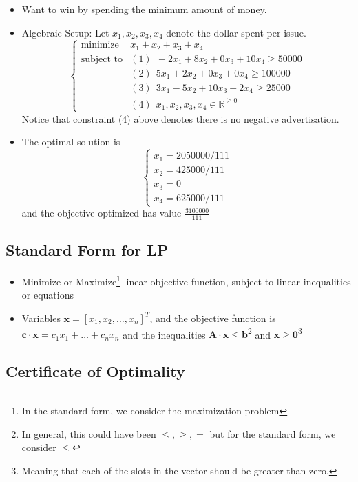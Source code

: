 \documentclass[10pt]{article}
\newcommand{\real}{\mathbb{R}}
\newcommand{\bx}{\mathbf{x}}
\begin{document}
\begin{itemize}
    \item Want to win by spending the minimum amount of money.
    \item Algebraic Setup: Let $x_1,x_2,x_3,x_4$ denote the dollar spent per issue. 
        $$
        \begin{cases}
            \text{minimize} &x_1 + x_2 + x_3 + x_4 \\
            \text{subject to} &(1)~~ -2x_1 + 8x_2 + 0x_3 + 10x_4 \geq 50000 \\
            &(2)~~5x_1 +2x_2 +0x_3 +0x_4 \geq 100000 \\
            &(3)~~ 3x_1 - 5x_2 + 10x_3 - 2x_4 \geq 25000 \\
            &(4)~~ x_1,x_2,x_3,x_4 \in \real^{\geq 0}
        \end{cases}
        $$
    Notice that constraint (4) above denotes there is no negative advertisation. 
    \item The optimal solution is 
        $$
        \begin{cases}
            x_1 = 2050000/111 \\
            x_2 = 425000/111 \\
            x_3 = 0 \\
            x_4 = 625000/111
        \end{cases}
        $$
        and the objective optimized has value $\frac{3100000}{111}$
\end{itemize}

\subsection{Standard Form for LP}
\begin{itemize}
    \item Minimize or Maximize\footnote{In the standard form, we consider the maximization problem} linear objective function, subject to linear inequalities or equations
    \item Variables $\bx = [x_1,x_2,\dots,x_n]^T$, and the objective function is $\mathbf{c} \cdot \bx = c_1x_1 + \dots + c_nx_n$ and the inequalities $\mathbf{A}\cdot \bx \leq \mathbf{b}$\footnote{In general, this could have been $\leq, \geq, =$ but for the standard form, we consider $\leq$} and $\bx \geq \mathbf{0}$\footnote{Meaning that each of the slots in the vector should be greater than zero.}
\end{itemize}

\subsection{Certificate of Optimality}
\end{document}
